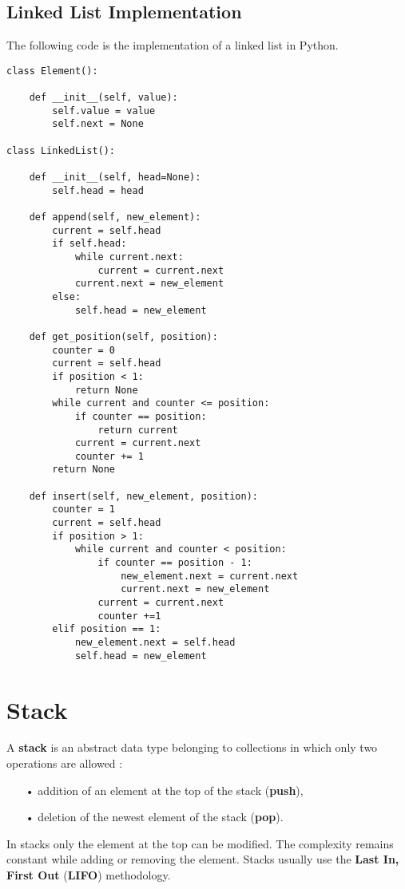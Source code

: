 \subsection{Linked List Implementation}
The following code is the implementation of a linked list in Python.
\begin{lstlisting}[firstnumber=1, caption={Linked List implementation.}]
class Element():

	def __init__(self, value):
		self.value = value
		self.next = None
		
class LinkedList():

	def __init__(self, head=None):
		self.head = head
		
	def append(self, new_element):
		current = self.head
		if self.head:
			while current.next:
				current = current.next
			current.next = new_element
		else:
			self.head = new_element
	
	def get_position(self, position):
		counter = 0
		current = self.head
		if position < 1:
			return None
		while current and counter <= position:
			if counter == position:
				return current
			current = current.next
			counter += 1
		return None
	
	def insert(self, new_element, position):
		counter = 1
		current = self.head
		if position > 1:
			while current and counter < position:
				if counter == position - 1:
					new_element.next = current.next
					current.next = new_element
				current = current.next
				counter +=1 
		elif position == 1:
			new_element.next = self.head
			self.head = new_element
\end{lstlisting}

\section{Stack}
\label{stack}
A \textbf{stack} is an abstract data type belonging to collections in which only two operations are allowed \cite{wikistack}:
\begin{itemize}
\item[•] addition of an element at the top of the stack (\textbf{push}),
\item[•] deletion of the newest element of the stack (\textbf{pop}).
\end{itemize}
In stacks only the element at the top can be modified. The complexity remains constant while adding or removing the element. Stacks usually use the \textbf{Last In, First Out} (\textbf{LIFO}) methodology.

